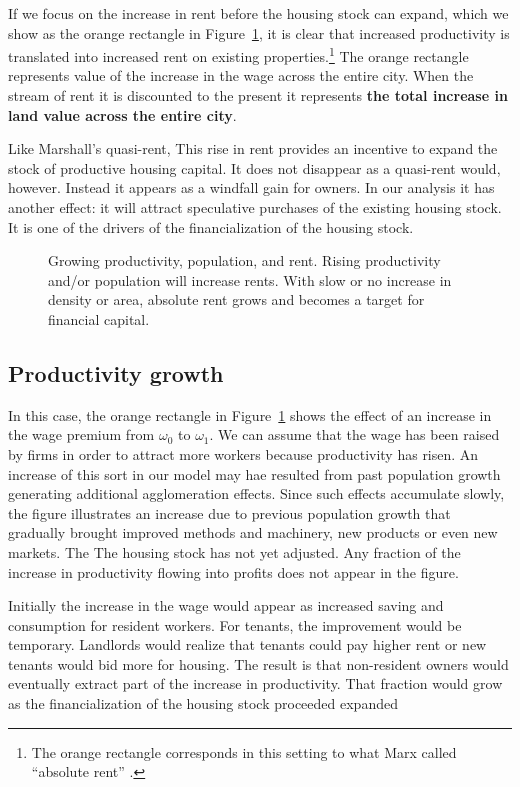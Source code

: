 If we focus on the increase in rent before the housing stock can expand, which we show as the orange rectangle in Figure~\ref{fig:absoluite_rent}, it is clear that increased productivity is translated into increased rent on existing properties.\footnote{The orange rectangle corresponds in this setting to what Marx called ``absolute rent'' \cite{dasilvaAbsoluteRent2018}. } The orange rectangle represents value of the increase in the wage across the entire city. When the stream of rent it is discounted to the present it represents \textbf{the total increase in land value across the entire city}. 

Like Marshall's quasi-rent, This rise in rent provides an incentive to expand the stock of productive housing capital.  It does not disappear  as a quasi-rent would, however. Instead it appears as a windfall gain for owners. In our analysis it has another effect: it will attract speculative purchases of the existing housing stock. It is one of the drivers of the financialization of the housing stock. 


\begin{figure}
    \centering
    
    \caption{Growing productivity, population, and rent. Rising productivity and/or population will increase rents. With slow or no increase in density or area,  absolute rent grows and becomes a target for financial capital.  }
    \label{fig:absoluite_rent}
\end{figure}

\subsection {Productivity growth}
In this case, the orange rectangle in Figure~\ref{fig:absoluite_rent} shows the effect of an increase in the wage premium from $\omega_0$ to $\omega_1$. We can assume that the wage has been raised by firms in order to attract more workers because productivity has risen. An increase of this sort in our model may hae resulted  from past population growth generating additional agglomeration effects. Since such effects accumulate slowly, the figure illustrates an increase due to previous population growth that gradually brought improved methods and machinery, new products or even new markets. The    
The housing stock has not yet adjusted.  Any fraction of the increase in productivity  flowing into profits does not appear in the figure. 


Initially the increase in the wage would appear as increased saving and consumption for resident workers. For tenants, the improvement would be temporary. Landlords would realize that tenants could pay higher rent or new tenants would bid more for housing. The result is that non-resident owners would eventually extract part of  the increase in productivity. That fraction would grow as the financialization of the housing stock proceeded expanded 

